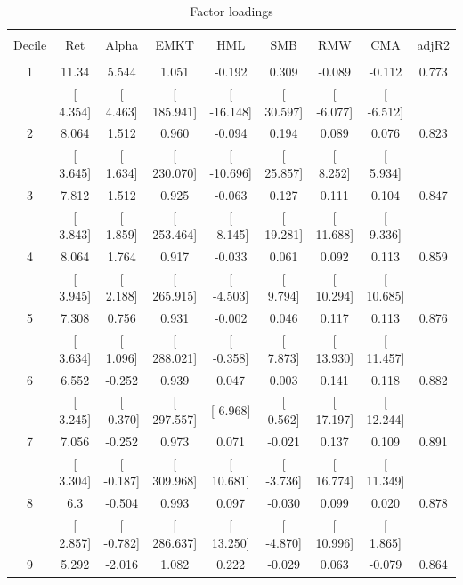 \documentclass[16pt]{article}
\begin{document}
\begin{table}[!htbp] \centering 
  \caption{Factor loadings} 
  \label{} 
\begin{tabular}{@{\extracolsep{5pt}} ccccccccc} 
\\[-1.8ex]\hline 
\hline \\[-1.8ex] 
Decile & Ret & Alpha & EMKT & HML & SMB & RMW & CMA & adjR2 \\ 
\hline \\[-1.8ex] 
1 & 11.34 & 5.544 & 1.051 & -0.192 & 0.309 & -0.089 & -0.112 & 0.773 \\ 
 & [ 4.354] & [ 4.463] & [ 185.941] & [ -16.148] & [ 30.597] & [ -6.077] & [ -6.512] &  \\ 
2 & 8.064 & 1.512 & 0.960 & -0.094 & 0.194 & 0.089 & 0.076 & 0.823 \\ 
 & [ 3.645] & [ 1.634] & [ 230.070] & [ -10.696] & [ 25.857] & [ 8.252] & [ 5.934] &  \\ 
3 & 7.812 & 1.512 & 0.925 & -0.063 & 0.127 & 0.111 & 0.104 & 0.847 \\ 
 & [ 3.843] & [ 1.859] & [ 253.464] & [ -8.145] & [ 19.281] & [ 11.688] & [ 9.336] &  \\ 
4 & 8.064 & 1.764 & 0.917 & -0.033 & 0.061 & 0.092 & 0.113 & 0.859 \\ 
 & [ 3.945] & [ 2.188] & [ 265.915] & [ -4.503] & [ 9.794] & [ 10.294] & [ 10.685] &  \\ 
5 & 7.308 & 0.756 & 0.931 & -0.002 & 0.046 & 0.117 & 0.113 & 0.876 \\ 
 & [ 3.634] & [ 1.096] & [ 288.021] & [ -0.358] & [ 7.873] & [ 13.930] & [ 11.457] &  \\ 
6 & 6.552 & -0.252 & 0.939 & 0.047 & 0.003 & 0.141 & 0.118 & 0.882 \\ 
 & [ 3.245] & [ -0.370] & [ 297.557] & [ 6.968] & [ 0.562] & [ 17.197] & [ 12.244] &  \\ 
7 & 7.056 & -0.252 & 0.973 & 0.071 & -0.021 & 0.137 & 0.109 & 0.891 \\ 
 & [ 3.304] & [ -0.187] & [ 309.968] & [ 10.681] & [ -3.736] & [ 16.774] & [ 11.349] &  \\ 
8 & 6.3 & -0.504 & 0.993 & 0.097 & -0.030 & 0.099 & 0.020 & 0.878 \\ 
 & [ 2.857] & [ -0.782] & [ 286.637] & [ 13.250] & [ -4.870] & [ 10.996] & [ 1.865] &  \\ 
9 & 5.292 & -2.016 & 1.082 & 0.222 & -0.029 & 0.063 & -0.079 & 0.864 \\ 

\end{tabular}
\end{table}
\end{document}
